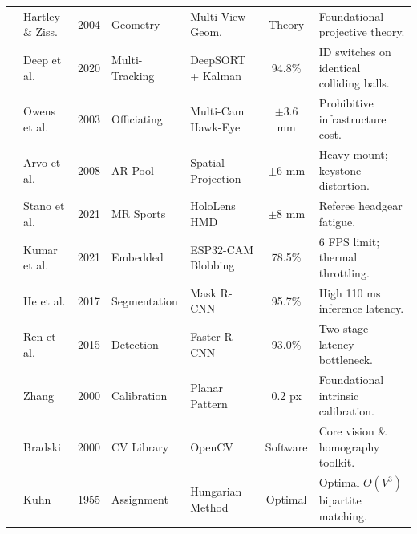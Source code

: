\documentclass[conference]{IEEEtran}
\begin{document}
\begin{table}[t]
\begin{tabular}{|c|l|c|l|l|c|p{4.8cm}|}
\cite{ref19} & Hartley \& Ziss. & 2004 & Geometry & Multi-View Geom. & Theory & Foundational projective theory. \\
\cite{ref21} & Deep et al. & 2020 & Multi-Tracking & DeepSORT + Kalman & 94.8\% & ID switches on identical colliding balls. \\
\cite{ref22} & Owens et al. & 2003 & Officiating & Multi-Cam Hawk-Eye & $\pm 3.6$ mm & Prohibitive infrastructure cost. \\
\cite{ref25} & Arvo et al. & 2008 & AR Pool & Spatial Projection & $\pm 6$ mm & Heavy mount; keystone distortion. \\
\cite{ref26} & Stano et al. & 2021 & MR Sports & HoloLens HMD & $\pm 8$ mm & Referee headgear fatigue. \\
\cite{ref28} & Kumar et al. & 2021 & Embedded & ESP32-CAM Blobbing & 78.5\% & 6 FPS limit; thermal throttling. \\
\cite{ref29} & He et al. & 2017 & Segmentation & Mask R-CNN & 95.7\% & High 110 ms inference latency. \\
\cite{ref33} & Ren et al. & 2015 & Detection & Faster R-CNN & 93.0\% & Two-stage latency bottleneck. \\
\cite{ref35} & Zhang & 2000 & Calibration & Planar Pattern & 0.2 px & Foundational intrinsic calibration. \\
\cite{ref39} & Bradski & 2000 & CV Library & OpenCV & Software & Core vision \& homography toolkit. \\
\cite{ref40} & Kuhn & 1955 & Assignment & Hungarian Method & Optimal & Optimal $O(V^3)$ bipartite matching. \\
\hline
\end{tabular}
\end{table}
\end{document}
